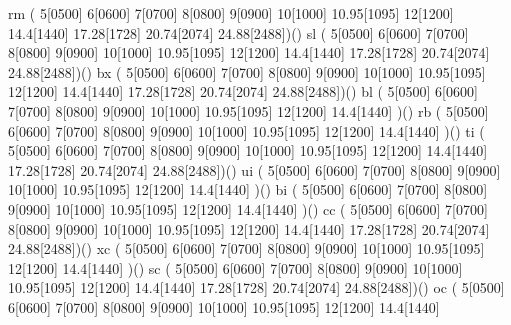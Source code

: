      \makefont\fonttwoletters rm   %
                        ( 5[0500] 6[0600] 7[0700] 8[0800] 9[0900]
                          10[1000] 10.95[1095] 12[1200] 14.4[1440]
                          17.28[1728] 20.74[2074] 24.88[2488])()
     \makefont\fonttwoletters sl   %
                        ( 5[0500] 6[0600] 7[0700] 8[0800] 9[0900]
                          10[1000] 10.95[1095] 12[1200] 14.4[1440]
                          17.28[1728] 20.74[2074] 24.88[2488])()
     \makefont\fonttwoletters bx   %
                        ( 5[0500] 6[0600] 7[0700] 8[0800] 9[0900]
                          10[1000] 10.95[1095] 12[1200] 14.4[1440]
                          17.28[1728] 20.74[2074] 24.88[2488])()
     \makefont\fonttwoletters bl   %
                        ( 5[0500] 6[0600] 7[0700] 8[0800] 9[0900]
                          10[1000] 10.95[1095] 12[1200] 14.4[1440]
                          )()
     \makefont\fonttwoletters rb   %
                        ( 5[0500] 6[0600] 7[0700] 8[0800] 9[0900]
                          10[1000] 10.95[1095] 12[1200] 14.4[1440]
                          )()
     \makefont\fonttwoletters ti   %
                        ( 5[0500] 6[0600] 7[0700] 8[0800] 9[0900]
                          10[1000] 10.95[1095] 12[1200] 14.4[1440]
                          17.28[1728] 20.74[2074] 24.88[2488])()
     \makefont\fonttwoletters ui   %
                        ( 5[0500] 6[0600] 7[0700] 8[0800] 9[0900]
                          10[1000] 10.95[1095] 12[1200] 14.4[1440]
                          )()
     \makefont\fonttwoletters bi   %
                        ( 5[0500] 6[0600] 7[0700] 8[0800] 9[0900]
                          10[1000] 10.95[1095] 12[1200] 14.4[1440]
                          )()
     \makefont\fonttwoletters cc   %
                        ( 5[0500] 6[0600] 7[0700] 8[0800] 9[0900]
                          10[1000] 10.95[1095] 12[1200] 14.4[1440]
                          17.28[1728] 20.74[2074] 24.88[2488])()
     \makefont\fonttwoletters xc   %
                        ( 5[0500] 6[0600] 7[0700] 8[0800] 9[0900]
                          10[1000] 10.95[1095] 12[1200] 14.4[1440]
                          )()
     \makefont\fonttwoletters sc   %
                        ( 5[0500] 6[0600] 7[0700] 8[0800] 9[0900]
                          10[1000] 10.95[1095] 12[1200] 14.4[1440]
                          17.28[1728] 20.74[2074] 24.88[2488])()
     \makefont\fonttwoletters oc    %
                        ( 5[0500] 6[0600] 7[0700] 8[0800] 9[0900]
                          10[1000] 10.95[1095] 12[1200] 14.4[1440]
